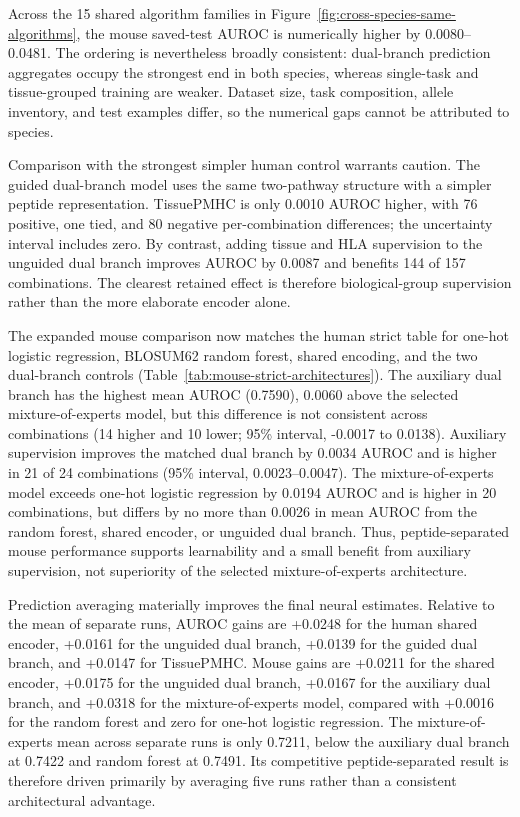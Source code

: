 
Across the 15 shared algorithm families in Figure~\ref{fig:cross-species-same-algorithms}, the mouse saved-test AUROC is numerically higher by 0.0080--0.0481. The ordering is nevertheless broadly consistent: dual-branch prediction aggregates occupy the strongest end in both species, whereas single-task and tissue-grouped training are weaker. Dataset size, task composition, allele inventory, and test examples differ, so the numerical gaps cannot be attributed to species.

Comparison with the strongest simpler human control warrants caution. The guided dual-branch model uses the same two-pathway structure with a simpler peptide representation. TissuePMHC is only 0.0010 AUROC higher, with 76 positive, one tied, and 80 negative per-combination differences; the uncertainty interval includes zero. By contrast, adding tissue and HLA supervision to the unguided dual branch improves AUROC by 0.0087 and benefits 144 of 157 combinations. The clearest retained effect is therefore biological-group supervision rather than the more elaborate encoder alone.

The expanded mouse comparison now matches the human strict table for one-hot logistic regression, BLOSUM62 random forest, shared encoding, and the two dual-branch controls (Table~\ref{tab:mouse-strict-architectures}). The auxiliary dual branch has the highest mean AUROC (0.7590), 0.0060 above the selected mixture-of-experts model, but this difference is not consistent across combinations (14 higher and 10 lower; 95\% interval, -0.0017 to 0.0138). Auxiliary supervision improves the matched dual branch by 0.0034 AUROC and is higher in 21 of 24 combinations (95\% interval, 0.0023--0.0047). The mixture-of-experts model exceeds one-hot logistic regression by 0.0194 AUROC and is higher in 20 combinations, but differs by no more than 0.0026 in mean AUROC from the random forest, shared encoder, or unguided dual branch. Thus, peptide-separated mouse performance supports learnability and a small benefit from auxiliary supervision, not superiority of the selected mixture-of-experts architecture.

Prediction averaging materially improves the final neural estimates. Relative to the mean of separate runs, AUROC gains are +0.0248 for the human shared encoder, +0.0161 for the unguided dual branch, +0.0139 for the guided dual branch, and +0.0147 for TissuePMHC\@. Mouse gains are +0.0211 for the shared encoder, +0.0175 for the unguided dual branch, +0.0167 for the auxiliary dual branch, and +0.0318 for the mixture-of-experts model, compared with +0.0016 for the random forest and zero for one-hot logistic regression. The mixture-of-experts mean across separate runs is only 0.7211, below the auxiliary dual branch at 0.7422 and random forest at 0.7491. Its competitive peptide-separated result is therefore driven primarily by averaging five runs rather than a consistent architectural advantage.
